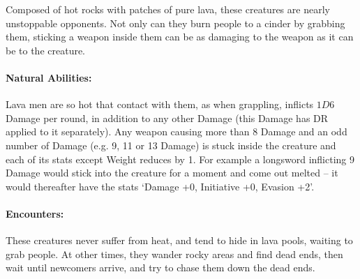 \begin{multicols}{2}
\archmage

\label{lavaman}

Composed of hot rocks with patches of pure lava, these creatures are nearly unstoppable opponents.  Not only can they burn people to a cinder by grabbing them, sticking a weapon inside them can be as damaging to the weapon as it can be to the creature.

\paragraph{Natural Abilities:} Lava men are so hot that contact with them, as when grappling, inflicts $1D6$ Damage per round, in addition to any other Damage (this Damage has DR applied to it separately).
Any weapon causing more than 8 Damage and an odd number of Damage (e.g. 9, 11 or 13 Damage) is stuck inside the creature and each of its stats except Weight reduces by 1.
For example a longsword inflicting 9 Damage would stick into the creature for a moment and come out melted -- it would thereafter have the stats `Damage +0, Initiative +0, Evasion +2'.

\paragraph{Encounters:} These creatures never suffer from heat, and tend to hide in lava pools, waiting to grab people.
At other times, they wander rocky areas and find dead ends, then wait until newcomers arrive, and try to chase them down the dead ends.

\lavaman

\end{multicols}
